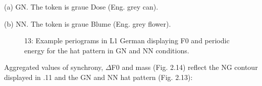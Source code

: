 \begin{stylecaption}
  
 
\end{stylecaption}

\begin{stylecaption}
(a) GN. The token is graue Dose (Eng. grey can).
\end{stylecaption}

\begin{stylecaption}
  
 
\end{stylecaption}

\begin{stylecaption}
(b) NN. The token is graue Blume (Eng. grey flower).
\end{stylecaption}

\begin{stylecaption}\begin{figure}
\caption{13: Example periograms in L1 German displaying F0 and periodic energy for the hat pattern in GN and NN conditions.}
\label{fig:key:2}
\end{figure}\end{stylecaption}

Aggregated values of synchrony, ${\Delta}$F0 and mass (Fig. 2.14) reflect the NG contour displayed in .11 and the GN and NN hat pattern (Fig. 2.13):

